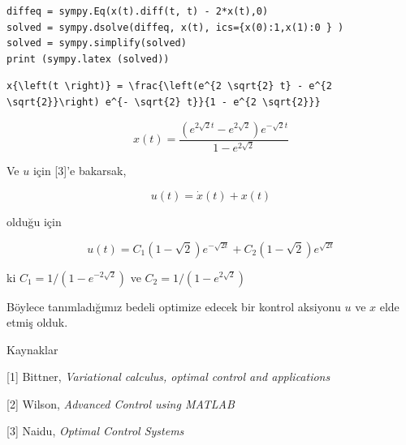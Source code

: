 \documentclass[12pt,fleqn]{article}\usepackage{../../common}
\begin{document}
\begin{verbatim}
diffeq = sympy.Eq(x(t).diff(t, t) - 2*x(t),0)
solved = sympy.dsolve(diffeq, x(t), ics={x(0):1,x(1):0 } ) 
solved = sympy.simplify(solved)
print (sympy.latex (solved))
\end{verbatim}

\begin{verbatim}
x{\left(t \right)} = \frac{\left(e^{2 \sqrt{2} t} - e^{2 \sqrt{2}}\right) e^{- \sqrt{2} t}}{1 - e^{2 \sqrt{2}}}
\end{verbatim}

$$
x{\left(t \right)} = \frac{\left(e^{2 \sqrt{2} t} - e^{2 \sqrt{2}}\right) e^{- \sqrt{2} t}}{1 - e^{2 \sqrt{2}}}
$$

Ve $u$ için [3]'e bakarsak, 

$$
u(t) = \dot{x}(t) + x(t) 
$$

olduğu için

$$
u(t) = C_1(1-\sqrt{2}) e^{-\sqrt{2t}} + C_2(1-\sqrt{2}) e^{\sqrt{2t}} 
$$

ki $C_1 = 1/(1-e^{-2\sqrt{2}})$ ve $C_2 = 1/(1-e^{2\sqrt{2}})$

Böylece tanımladığımız bedeli optimize edecek bir kontrol aksiyonu $u$ ve
$x$ elde etmiş olduk. 

Kaynaklar

[1] Bittner, {\em Variational calculus, optimal control and applications}

[2] Wilson, {\em Advanced Control using MATLAB}

[3] Naidu, {\em Optimal Control Systems}
\end{document}
